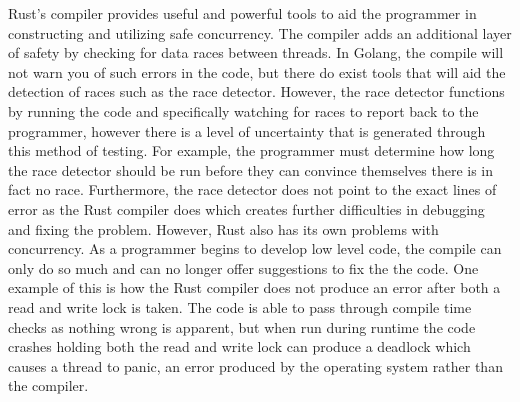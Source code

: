 \documentclass{article}
\begin{document}
Rust’s compiler provides useful and powerful tools to aid the programmer in constructing and utilizing safe concurrency. The compiler adds an additional layer of safety by checking for data races between threads. In Golang, the compile will not warn you of such errors in the code, but there do exist tools that will aid the detection of races such as the race detector. However, the race detector functions by running the code and specifically watching for races to report back to the programmer, however there is a level of uncertainty that is generated through this method of testing. For example, the programmer must determine how long the race detector should be run before they can convince themselves there is in fact no race. Furthermore, the race detector does not point to the exact lines of error as the Rust compiler does which creates further difficulties in debugging and fixing the problem. However, Rust also has its own problems with concurrency. As a programmer begins to develop low level code, the compile can only do so much and can no longer offer suggestions to fix the the code. One example of this is how the Rust compiler does not produce an error after both a read and write lock is taken. The code is able to pass through compile time checks as nothing wrong is apparent, but when run during runtime the code crashes holding both the read and write lock can produce a deadlock which causes a thread to panic, an error produced by the operating system rather than the compiler.
\end{document}
